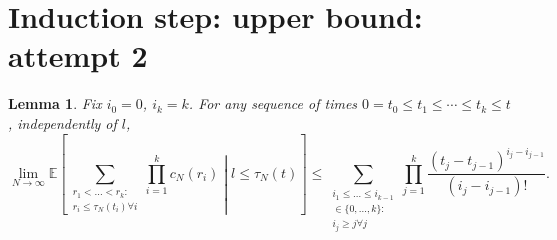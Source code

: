 \documentclass{article}
\newtheorem{lemma}{Lemma}
\newcommand{\E}{\mathbb{E}}
\newcommand{\1}[1]{\mathbbm{1}_{#1}}
\begin{document}
\section*{Induction step: upper bound: attempt 2}
\begin{lemma}\label{thm:LOterms_UB}
Fix $i_0=0$, $i_k=k$. For any sequence of times $0 = t_0 \leq t_1 \leq \cdots \leq t_k \leq t$, independently of $l$,
\begin{equation}
\lim_{N\to\infty} \E \left[ \sum_{\substack{r_1<\dots<r_k :\\ r_i\leq \tau_N(t_i) \forall i}} \prod_{i=1}^k c_N(r_i) \middle|  l \leq \tau_N(t) \right] 
\leq \sum_{\substack{i_1\leq \dots\leq i_{k-1}\\ \in \{0,\dots,k\} :\\ i_j \geq j \forall j}} \prod_{j=1}^k \frac{(t_j - t_{j-1})^{i_j - i_{j-1}}}{(i_j - i_{j-1})! } .
\end{equation}
\end{lemma}
\end{document}
